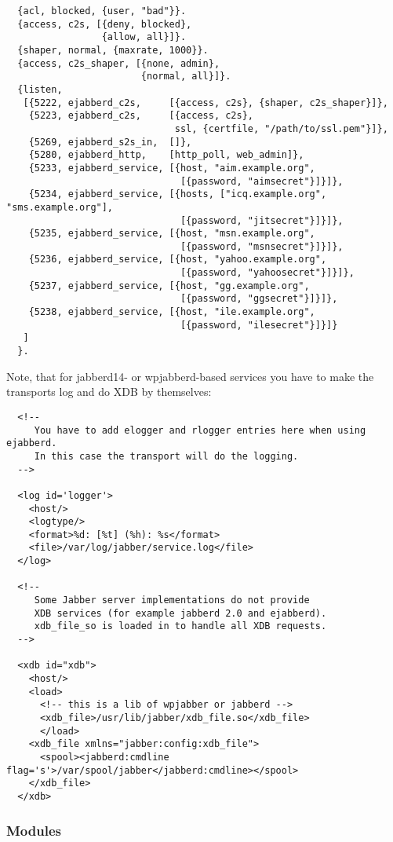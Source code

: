 \documentclass[a4paper,10pt]{article}
\begin{document}
\begin{verbatim}
  {acl, blocked, {user, "bad"}}.
  {access, c2s, [{deny, blocked},
                 {allow, all}]}.
  {shaper, normal, {maxrate, 1000}}.
  {access, c2s_shaper, [{none, admin},
                        {normal, all}]}.
  {listen,
   [{5222, ejabberd_c2s,     [{access, c2s}, {shaper, c2s_shaper}]},
    {5223, ejabberd_c2s,     [{access, c2s},
                              ssl, {certfile, "/path/to/ssl.pem"}]},
    {5269, ejabberd_s2s_in,  []},
    {5280, ejabberd_http,    [http_poll, web_admin]},
    {5233, ejabberd_service, [{host, "aim.example.org",
                               [{password, "aimsecret"}]}]},
    {5234, ejabberd_service, [{hosts, ["icq.example.org", "sms.example.org"],
                               [{password, "jitsecret"}]}]},
    {5235, ejabberd_service, [{host, "msn.example.org",
                               [{password, "msnsecret"}]}]},
    {5236, ejabberd_service, [{host, "yahoo.example.org",
                               [{password, "yahoosecret"}]}]},
    {5237, ejabberd_service, [{host, "gg.example.org",
                               [{password, "ggsecret"}]}]},
    {5238, ejabberd_service, [{host, "ile.example.org",
                               [{password, "ilesecret"}]}]}
   ]
  }.
\end{verbatim}
Note, that for jabberd14- or wpjabberd-based services you have to make the
transports log and do XDB by themselves:
\begin{verbatim}
  <!--
     You have to add elogger and rlogger entries here when using ejabberd.
     In this case the transport will do the logging.
  -->

  <log id='logger'>
    <host/>
    <logtype/>
    <format>%d: [%t] (%h): %s</format>
    <file>/var/log/jabber/service.log</file>
  </log>

  <!--
     Some Jabber server implementations do not provide
     XDB services (for example jabberd 2.0 and ejabberd).
     xdb_file_so is loaded in to handle all XDB requests.
  -->

  <xdb id="xdb">
    <host/>
    <load>
      <!-- this is a lib of wpjabber or jabberd -->
      <xdb_file>/usr/lib/jabber/xdb_file.so</xdb_file>
      </load>
    <xdb_file xmlns="jabber:config:xdb_file">
      <spool><jabberd:cmdline flag='s'>/var/spool/jabber</jabberd:cmdline></spool>
    </xdb_file>
  </xdb>
\end{verbatim}


\subsubsection{Modules}
\label{sec:configmodules}
\end{document}
